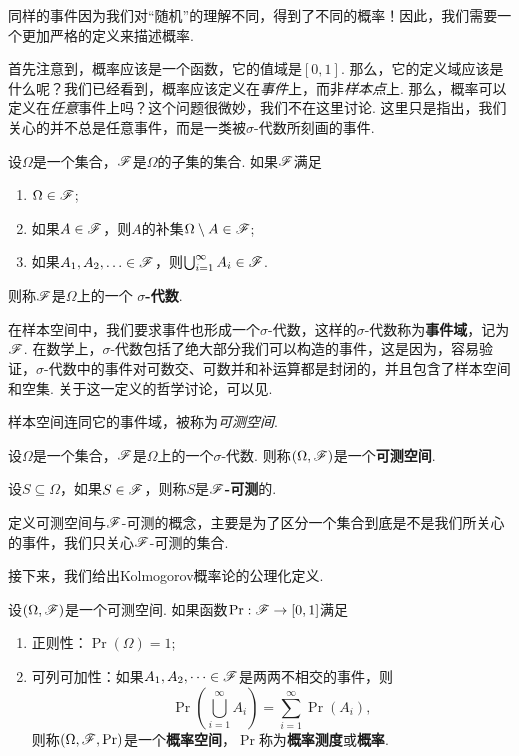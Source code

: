 同样的事件因为我们对“随机”的理解不同，得到了不同的概率！因此，我们需要一个更加严格的定义来描述概率. 

首先注意到，概率应该是一个函数，它的值域是$[0,1]$. 那么，它的定义域应该是什么呢？我们已经看到，概率应该定义在\textit{事件}上，而非\textit{样本点}上. 那么，概率可以定义在\textit{任意}事件上吗？这个问题很微妙，我们不在这里讨论. 这里只是指出，我们关心的并不总是任意事件，而是一类被$\sigma$-代数所刻画的事件. 

\begin{definition}[$\sigma$-代数]
设$\Omega$是一个集合，$\mathscr{F}$是$\Omega$的子集的集合. 如果$\mathscr{F}$满足
\begin{enumerate}
    \item $\Omega\in\mathscr{F}$;
    \item 如果$A\in\mathscr{F}$，则$A$的补集$\Omega\setminus A\in\mathscr{F}$;
    \item 如果$A_1,A_2,\ldots\in\mathscr{F}$，则$\bigcup_{i=1}^\infty A_i\in\mathscr{F}$.
\end{enumerate}
则称$\mathscr{F}$是$\Omega$上的一个 \textbf{$\sigma$-代数}. 
\end{definition}


在样本空间中，我们要求事件也形成一个$\sigma$-代数，这样的$\sigma$-代数称为\textbf{事件域}，记为$\mathscr{F}$. 在数学上，$\sigma$-代数包括了绝大部分我们可以构造的事件，这是因为，容易验证，$\sigma$-代数中的事件对可数交、可数并和补运算都是封闭的，并且包含了样本空间和空集. 关于这一定义的哲学讨论，可以见.  

样本空间连同它的事件域，被称为\textit{可测空间}. 

\begin{definition}[可测空间] 
设$\Omega$是一个集合，$\mathscr{F}$是$\Omega$上的一个$\sigma$-代数. 则称$(\Omega,\mathscr{F})$是一个\textbf{可测空间}.

设$S\subseteq\Omega$，如果$S\in\mathscr{F}$，则称$S$是\textbf{$\mathscr{F}$-可测}的.
\end{definition}

定义可测空间与$\mathscr{F}$-可测的概念，主要是为了区分一个集合到底是不是我们所关心的事件，我们只关心$\mathscr{F}$-可测的集合.

接下来，我们给出Kolmogorov概率论的公理化定义. 

\begin{definition}
设$(\Omega,\mathscr{F})$是一个可测空间. 如果函数$\Pr:\mathscr{F}\to[0,1]$满足
\begin{enumerate}
    \item 正则性：$\Pr(\Omega)=1$;
    \item 可列可加性：如果$A_1,A_2,\dots\in\mathscr{F}$是两两不相交的事件，则
    \[
        \Pr\left(\bigcup_{i=1}^\infty A_i\right) = \sum_{i=1}^\infty \Pr(A_i),
    \]
    则称$(\Omega,\mathscr{F},\Pr)$是一个\textbf{概率空间}，$\Pr$称为\textbf{概率测度}或\textbf{概率}. 
\end{enumerate}
\end{definition}

